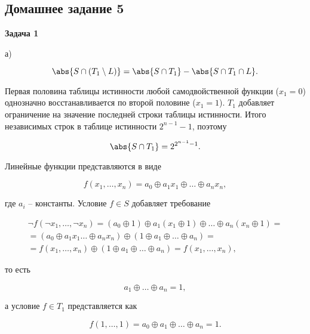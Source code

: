 \subsection{Домашнее задание 5}

	\begin{center}
    \textbf{Задача 1}
\end{center}
		а)

		\begin{equation*}
			\abs{S \cap (T_1 \setminus L)} = \abs{S \cap T_1} - \abs{S \cap T_1 \cap L}.
		\end{equation*}

		Первая половина таблицы истинности любой самодвойственной функции ($x_1 = 0$) однозначно восстанавливается по второй половине ($x_1 = 1$). $T_1$ добавляет ограничение на значение последней строки таблицы истинности. Итого независимых строк в таблице истинности $2^{n-1}-1$, поэтому

		\begin{equation*}
			\abs{S \cap T_1} = 2^{2^{n-1}-1}.
		\end{equation*}

		Линейные функции представляются в виде

		\begin{equation*}
			f(x_1, \dots, x_n) = a_0 \oplus a_1 x_1 \oplus \dots \oplus a_n x_n,
		\end{equation*}

		где $a_i$ -- константы. Условие $f \in S$ добавляет требование

		\begin{multline*}
			\neg f(\neg x_1, \dots, \neg x_n) = (a_0 \oplus 1) \oplus a_1 (x_1 \oplus 1) \oplus \dots \oplus a_n (x_n \oplus 1) = \\
			= (a_0 \oplus a_1 x_1 \dots \oplus a_n x_n) \oplus (1 \oplus a_1 \oplus \dots \oplus a_n) = \\
			= f(x_1, \dots, x_n) \oplus (1 \oplus a_1 \oplus \dots \oplus a_n) = f(x_1, \dots, x_n),
		\end{multline*}

		то есть

		\begin{equation*}
			a_1 \oplus \dots \oplus a_n = 1,
		\end{equation*}

		а условие $f \in T_1$ представляется как

		\begin{equation*}
			f(1, \dots, 1) = a_0 \oplus a_1 \oplus \dots \oplus a_n = 1.
		\end{equation*}

